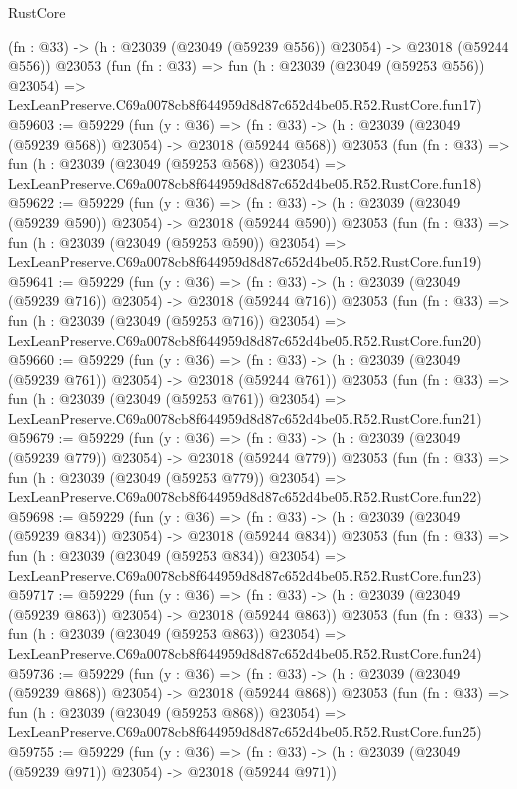 \begin{lexlean}{RustCore}
\begin{coremodule}
    (fn : @33) -> (h : @23039 (@23049 (@59239 @556)) @23054) -> @23018 (@59244 @556))
    @23053
    (fun (fn : @33) =>
    fun (h : @23039 (@23049 (@59253 @556)) @23054) =>
    LexLeanPreserve.C69a0078cb8f644959d8d87c652d4be05.R52.RustCore.fun17)
@59603 := @59229
    (fun (y : @36) =>
    (fn : @33) -> (h : @23039 (@23049 (@59239 @568)) @23054) -> @23018 (@59244 @568))
    @23053
    (fun (fn : @33) =>
    fun (h : @23039 (@23049 (@59253 @568)) @23054) =>
    LexLeanPreserve.C69a0078cb8f644959d8d87c652d4be05.R52.RustCore.fun18)
@59622 := @59229
    (fun (y : @36) =>
    (fn : @33) -> (h : @23039 (@23049 (@59239 @590)) @23054) -> @23018 (@59244 @590))
    @23053
    (fun (fn : @33) =>
    fun (h : @23039 (@23049 (@59253 @590)) @23054) =>
    LexLeanPreserve.C69a0078cb8f644959d8d87c652d4be05.R52.RustCore.fun19)
@59641 := @59229
    (fun (y : @36) =>
    (fn : @33) -> (h : @23039 (@23049 (@59239 @716)) @23054) -> @23018 (@59244 @716))
    @23053
    (fun (fn : @33) =>
    fun (h : @23039 (@23049 (@59253 @716)) @23054) =>
    LexLeanPreserve.C69a0078cb8f644959d8d87c652d4be05.R52.RustCore.fun20)
@59660 := @59229
    (fun (y : @36) =>
    (fn : @33) -> (h : @23039 (@23049 (@59239 @761)) @23054) -> @23018 (@59244 @761))
    @23053
    (fun (fn : @33) =>
    fun (h : @23039 (@23049 (@59253 @761)) @23054) =>
    LexLeanPreserve.C69a0078cb8f644959d8d87c652d4be05.R52.RustCore.fun21)
@59679 := @59229
    (fun (y : @36) =>
    (fn : @33) -> (h : @23039 (@23049 (@59239 @779)) @23054) -> @23018 (@59244 @779))
    @23053
    (fun (fn : @33) =>
    fun (h : @23039 (@23049 (@59253 @779)) @23054) =>
    LexLeanPreserve.C69a0078cb8f644959d8d87c652d4be05.R52.RustCore.fun22)
@59698 := @59229
    (fun (y : @36) =>
    (fn : @33) -> (h : @23039 (@23049 (@59239 @834)) @23054) -> @23018 (@59244 @834))
    @23053
    (fun (fn : @33) =>
    fun (h : @23039 (@23049 (@59253 @834)) @23054) =>
    LexLeanPreserve.C69a0078cb8f644959d8d87c652d4be05.R52.RustCore.fun23)
@59717 := @59229
    (fun (y : @36) =>
    (fn : @33) -> (h : @23039 (@23049 (@59239 @863)) @23054) -> @23018 (@59244 @863))
    @23053
    (fun (fn : @33) =>
    fun (h : @23039 (@23049 (@59253 @863)) @23054) =>
    LexLeanPreserve.C69a0078cb8f644959d8d87c652d4be05.R52.RustCore.fun24)
@59736 := @59229
    (fun (y : @36) =>
    (fn : @33) -> (h : @23039 (@23049 (@59239 @868)) @23054) -> @23018 (@59244 @868))
    @23053
    (fun (fn : @33) =>
    fun (h : @23039 (@23049 (@59253 @868)) @23054) =>
    LexLeanPreserve.C69a0078cb8f644959d8d87c652d4be05.R52.RustCore.fun25)
@59755 := @59229
    (fun (y : @36) =>
    (fn : @33) -> (h : @23039 (@23049 (@59239 @971)) @23054) -> @23018 (@59244 @971))

\end{coremodule}
\end{lexlean}
